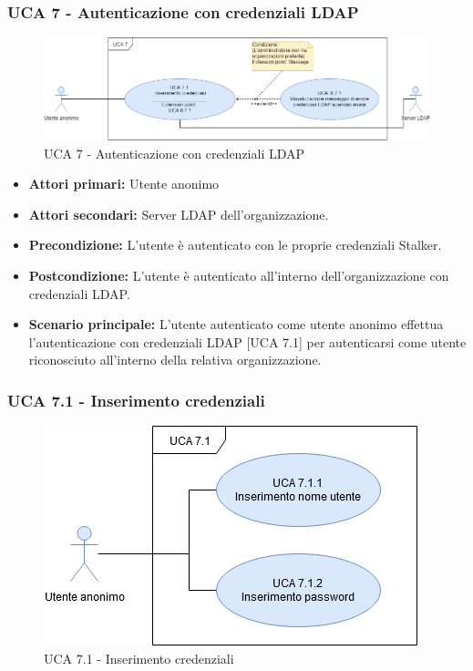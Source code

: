 


\subsubsection{UCA 7 - Autenticazione con credenziali LDAP}%

\begin{figure}[h]
	\centering
	\includegraphics[scale=0.4, center]{sezioni/UseCase/Immagini/UCA7.png}
	\caption{UCA 7 - Autenticazione con credenziali LDAP}
\end{figure}

\begin{itemize}
	\item \textbf{Attori primari:} Utente anonimo 
	\item \textbf{Attori secondari:} Server LDAP dell'organizzazione.
	\item \textbf{Precondizione:} L'utente è autenticato con le proprie credenziali Stalker.
	\item \textbf{Postcondizione:} L'utente è autenticato all'interno dell'organizzazione con credenziali LDAP.
	\item \textbf{Scenario principale:} L'utente autenticato come utente anonimo effettua l'autenticazione con credenziali LDAP [UCA 7.1] per autenticarsi come utente riconosciuto all'interno della relativa organizzazione.
\end{itemize}

\subsubsection{UCA 7.1 - Inserimento credenziali}
\begin{figure}[h]
	\centering
	\includegraphics[scale=0.5, center]{sezioni/UseCase/Immagini/UCA7.1.png}
	\caption{UCA 7.1 - Inserimento credenziali}
\end{figure}

